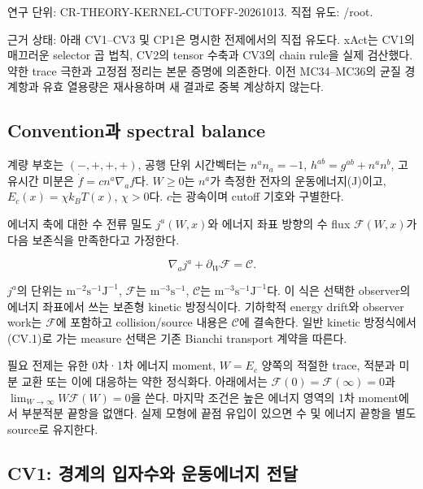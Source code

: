 연구 단위: CR-THEORY-KERNEL-CUTOFF-20261013. 직접 유도: /root.

근거 상태: 아래 CV1--CV3 및 CP1은 명시한 전제에서의 직접 유도다. xAct는 CV1의 매끄러운 selector 곱 법칙, CV2의 tensor 수축과 CV3의 chain rule을 실제 검산했다. 약한 trace 극한과 고정점 정리는 본문 증명에 의존한다. 이전 MC34--MC36의 균질 경계항과 유효 열용량은 재사용하며 새 결과로 중복 계상하지 않는다.

\hypertarget{conventionuxacfc-spectral-balance}{%
\subsection{Convention과 spectral balance}\label{conventionuxacfc-spectral-balance}}

계량 부호는 \((-,+,+,+)\), 공행 단위 시간벡터는 \(n^an_a=-1\), \(h^{ab}=g^{ab}+n^an^b\), 고유시간 미분은 \(\dot f=c n^a\nabla_af\)다. \(W\ge0\)는 \(n^a\)가 측정한 전자의 운동에너지(J)이고, \(E_c(x)=\chi k_BT(x)\), \(\chi>0\)다. \(c\)는 광속이며 cutoff 기호와 구별한다.

에너지 축에 대한 수 전류 밀도 \(j^a(W,x)\)와 에너지 좌표 방향의 수 flux \(\mathcal F(W,x)\)가 다음 보존식을 만족한다고 가정한다.

\[
\nabla_a j^a+\partial_W\mathcal F=\mathcal C.
\tag{CV.1}
\]

\(j^a\)의 단위는 \(\mathrm{m^{-2}s^{-1}J^{-1}}\), \(\mathcal F\)는 \(\mathrm{m^{-3}s^{-1}}\), \(\mathcal C\)는 \(\mathrm{m^{-3}s^{-1}J^{-1}}\)다. 이 식은 선택한 observer의 에너지 좌표에서 쓰는 보존형 kinetic 방정식이다. 기하학적 energy drift와 observer work는 \(\mathcal F\)에 포함하고 collision/source 내용은 \(\mathcal C\)에 결속한다. 일반 kinetic 방정식에서 (CV.1)로 가는 measure 선택은 기존 Bianchi transport 계약을 따른다.

필요 전제는 유한 0차·1차 에너지 moment, \(W=E_c\) 양쪽의 적절한 trace, 적분과 미분 교환 또는 이에 대응하는 약한 정식화다. 아래에서는 \(\mathcal F(0)=\mathcal F(\infty)=0\)과 \(\lim_{W\to\infty}W\mathcal F(W)=0\)을 쓴다. 마지막 조건은 높은 에너지 영역의 1차 moment에서 부분적분 끝항을 없앤다. 실제 모형에 끝점 유입이 있으면 수 및 에너지 끝항을 별도 source로 유지한다.

\hypertarget{cv1-uxacbduxacc4uxc758-uxc785uxc790uxc218uxc640-uxc6b4uxb3d9uxc5d0uxb108uxc9c0-uxc804uxb2ec}{%
\subsection{CV1: 경계의 입자수와 운동에너지 전달}\label{cv1-uxacbduxacc4uxc758-uxc785uxc790uxc218uxc640-uxc6b4uxb3d9uxc5d0uxb108uxc9c0-uxc804uxb2ec}}

